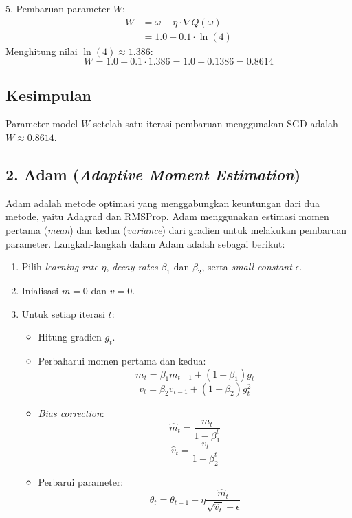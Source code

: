 5. Pembaruan parameter \( W \):
   \begin{align*}
       W & = \omega - \eta \cdot \nabla Q(\omega) \\
       & = 1.0 - 0.1 \cdot \ln(4)
   \end{align*}
   Menghitung nilai \( \ln(4) \approx 1.386 \):
   \[
   W = 1.0 - 0.1 \cdot 1.386 = 1.0 - 0.1386 = 0.8614
   \]

\subsection*{Kesimpulan}
Parameter model \( W \) setelah satu iterasi pembaruan menggunakan SGD adalah \( W \approx 0.8614 \).


\subsection*{2. Adam (\textit{Adaptive Moment Estimation})}

Adam adalah metode optimasi yang menggabungkan keuntungan dari dua metode, yaitu Adagrad dan RMSProp. Adam menggunakan estimasi momen pertama (\textit{mean}) dan kedua (\textit{variance}) dari gradien untuk melakukan pembaruan parameter. Langkah-langkah dalam Adam adalah sebagai berikut:

\begin{enumerate}
    \item Pilih \textit{learning rate} \(\eta\), \textit{decay rates} \(\beta_1\) dan \(\beta_2\), serta \textit{small constant} \(\epsilon\).
    \item Inialisasi \(m = 0\) dan \(v = 0\).
    \item Untuk setiap iterasi \(t\):
    \begin{itemize}
        \item Hitung gradien \(g_t\).
        \item Perbaharui momen pertama dan kedua:
        \[
        m_t = \beta_1 m_{t-1} + (1 - \beta_1) g_t
        \]
        \[
        v_t = \beta_2 v_{t-1} + (1 - \beta_2) g_t^2
        \]
        \item \textit{Bias correction}:
        \[
        \hat{m}_t = \frac{m_t}{1 - \beta_1^t}
        \]
        \[
        \hat{v}_t = \frac{v_t}{1 - \beta_2^t}
        \]
        \item Perbarui parameter:
        \[
        \theta_t = \theta_{t-1} - \eta \frac{\hat{m}_t}{\sqrt{\hat{v}_t} + \epsilon}
        \]
    \end{itemize}
\end{enumerate}

